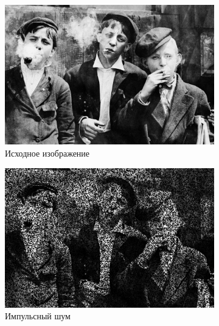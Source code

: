   \begin{figure}[ht!] 
    \centering
    \begin{subfigure}[b]{0.5\linewidth}
        \centering
        \includegraphics[width=0.95\linewidth]{../lewis-hine-taschen-main-3.jpg} 
        \caption{Исходное изображение} 
        \label{contraharmonic_-0.85:a} 
        \vspace{4ex}
    \end{subfigure}%
    \begin{subfigure}[b]{0.5\linewidth}
      \centering
      \includegraphics[width=0.95\linewidth]{../Contraharmonic_Filter/Contraharmonic_Impulse_noise_(m,n=(3,_3),q=-0.85).jpg} 
      \caption{Импульсный шум} 
      \label{contraharmonic_-0.85:b} 
      \vspace{4ex}
    \end{subfigure}
    \begin{subfigure}[b]{0.5\linewidth}
      \centering

\end{subfigure}
\end{figure}
